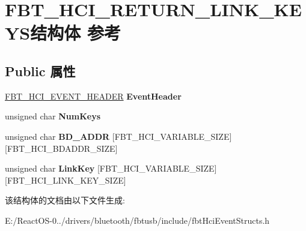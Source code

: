 \hypertarget{struct_f_b_t___h_c_i___r_e_t_u_r_n___l_i_n_k___k_e_y_s}{}\section{F\+B\+T\+\_\+\+H\+C\+I\+\_\+\+R\+E\+T\+U\+R\+N\+\_\+\+L\+I\+N\+K\+\_\+\+K\+E\+Y\+S结构体 参考}
\label{struct_f_b_t___h_c_i___r_e_t_u_r_n___l_i_n_k___k_e_y_s}
\subsection*{Public 属性}
\begin{DoxyCompactItemize}
\item 
\mbox{\label{struct_f_b_t___h_c_i___r_e_t_u_r_n___l_i_n_k___k_e_y_s_a310f5b0f1c34ca1415cb799f57ffe49e}} 
\hyperlink{struct_f_b_t___h_c_i___e_v_e_n_t___h_e_a_d_e_r}{F\+B\+T\+\_\+\+H\+C\+I\+\_\+\+E\+V\+E\+N\+T\+\_\+\+H\+E\+A\+D\+ER} {\bfseries Event\+Header}
\item 
\mbox{\label{struct_f_b_t___h_c_i___r_e_t_u_r_n___l_i_n_k___k_e_y_s_a4adee2a973778f087ccc0c8be8bdc330}} 
unsigned char {\bfseries Num\+Keys}
\item 
\mbox{\label{struct_f_b_t___h_c_i___r_e_t_u_r_n___l_i_n_k___k_e_y_s_a938937e0d1bf52d9217f9f52d06e39a5}} 
unsigned char {\bfseries B\+D\+\_\+\+A\+D\+DR} \mbox{[}F\+B\+T\+\_\+\+H\+C\+I\+\_\+\+V\+A\+R\+I\+A\+B\+L\+E\+\_\+\+S\+I\+ZE\mbox{]}\mbox{[}F\+B\+T\+\_\+\+H\+C\+I\+\_\+\+B\+D\+A\+D\+D\+R\+\_\+\+S\+I\+ZE\mbox{]}
\item 
\mbox{\label{struct_f_b_t___h_c_i___r_e_t_u_r_n___l_i_n_k___k_e_y_s_aefbef06553165f88fb5f4fc58a7b6636}} 
unsigned char {\bfseries Link\+Key} \mbox{[}F\+B\+T\+\_\+\+H\+C\+I\+\_\+\+V\+A\+R\+I\+A\+B\+L\+E\+\_\+\+S\+I\+ZE\mbox{]}\mbox{[}F\+B\+T\+\_\+\+H\+C\+I\+\_\+\+L\+I\+N\+K\+\_\+\+K\+E\+Y\+\_\+\+S\+I\+ZE\mbox{]}
\end{DoxyCompactItemize}


该结构体的文档由以下文件生成\+:\begin{DoxyCompactItemize}
\item 
E\+:/\+React\+O\+S-\/0../drivers/bluetooth/fbtusb/include/fbt\+Hci\+Event\+Structs.\+h\end{DoxyCompactItemize}
